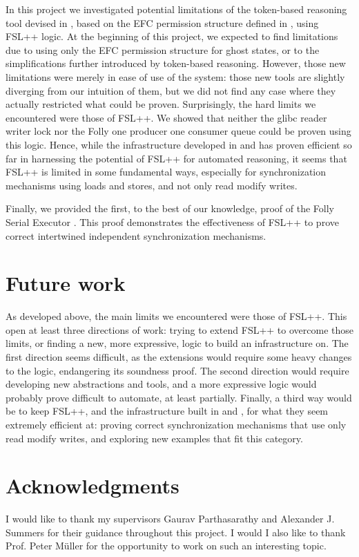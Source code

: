 In this project we investigated potential limitations of the token-based reasoning tool devised in \cite{pascal}, based on the EFC permission structure defined in \cite{gaurav}, using FSL++ logic. At the beginning of this project, we expected to find limitations due to using only the EFC permission structure for ghost states, or to the simplifications further introduced by token-based reasoning. However, those new limitations were merely in ease of use of the system: those new tools are slightly diverging from our intuition of them, but we did not find any case where they actually restricted what could be proven. Surprisingly, the hard limits we encountered were those of FSL++. We showed that neither the glibc reader writer lock \cite{glibcRW} nor the Folly one producer one consumer queue \cite{queue} could be proven using this logic. Hence, while the infrastructure developed in \cite{gaurav} and \cite{pascal} has proven efficient so far in harnessing the potential of FSL++ for automated reasoning, it seems that FSL++ is limited in some fundamental ways, especially for synchronization mechanisms using loads and stores, and not only read modify writes.

Finally, we provided the first, to the best of our knowledge, proof of the Folly Serial Executor \cite{serialExec}. This proof demonstrates the effectiveness of FSL++ to prove correct intertwined independent synchronization mechanisms.

\section{Future work}

As developed above, the main limits we encountered were those of FSL++. This open at least three directions of work: trying to extend FSL++ to overcome those limits, or finding a new, more expressive, logic to build an infrastructure on. The first direction seems difficult, as the extensions would require some heavy changes to the logic, endangering its soundness proof. The second direction would require developing new abstractions and tools, and a more expressive logic would probably prove difficult to automate, at least partially. Finally, a third way would be to keep FSL++, and the infrastructure built in \cite{gaurav} and \cite{pascal}, for what they seem extremely efficient at: proving correct synchronization mechanisms that use only read modify writes, and exploring new examples that fit this category.

\section{Acknowledgments}
I would like to thank my supervisors Gaurav Parthasarathy and Alexander J. Summers for their guidance throughout this project. I would I also like to thank Prof. Peter Müller for the opportunity to work on such an interesting topic.
